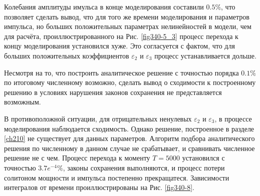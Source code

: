 \documentclass[14pt,a4paper]{extreport}
\begin{document}
			Колебания амплитуды имульса в конце моделирования составили \(0.5\%\), что позволяет сделать вывод, что для того же времени моделирования и параметров импульса, но больших положительных параметрах нелинейностей в модели, чем для расчёта, проиллюстрированного на Рис. \ref{fig340-5_3} процесс перехода к концу моделирования установился хуже. Это согласуется с фактом, что для больших положительных коэффициентов \(\varepsilon_{2}\) и \(\varepsilon_{3}\) процесс устанавливается дольше.

			Несмотря на то, что построить аналитическое решение с точностью порядка \(0.1\%\) по итоговому численному возможно, сделать вывод о сходимости к построенному решению в условиях нарушения законов сохранения не представляется возможным.

			В противоположной ситуации, для отрицательных ненулевых \(\varepsilon_{2}\) и \(\varepsilon_{3}\), в процессе моделирования наблюдается сходимость. Однако решение, построенное в разделе \ref{ch210} не существует для данных параметров. Алгоритм подбора аналитического решения по численному в данном случае не срабатывает, и сравнивать численное решение не с чем. Процесс перехода к моменту \(T=5000\) установился с точностью \(3.7e^{-4}\%\), законы сохранения выполняются, и процесс потери солитоном мощности и импульса постепенно прекращатеся. Зависимости интегралов от времени проиллюстрированы на Рис. \ref{fig340-8}.
\end{document}
